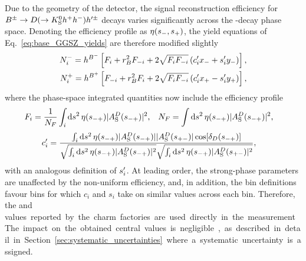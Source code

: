 Due to the geometry of the \lhcb detector, the signal reconstruction efficiency for ${{B}^\pm}\rightarrow{\ensuremath{D}}(\rightarrow{\ensuremath{{K}^0_{\mathrm{S}}}} h^+h^-)h'^\pm$ decays varies significantly across the \D-decay phase space. Denoting the efficiency profile as $\eta(s_-, s_+)$, the yield equations of Eq.~\eqref{eq:base_GGSZ_yields} are therefore modified slightly
\begin{align}
\begin{split}    \label{eq:lhcb_GGSZ_yields}
    N^-_i = h^{{{B}^-}} \left[F_i + r_{B}^2F_{-i} + 2\sqrt{F_iF_{-i}}\left(c_i'x_-+s_i'y_-\right)\right], \\
    N^+_i = h^{{{B}^+}} \left[F_{-i} + r_{B}^2F_i + 2\sqrt{F_iF_{-i}}\left(c_i'x_+-s_i'y_+\right)\right],
\end{split}
\end{align}
where the phase-space integrated quantities now include the efficiency profile
\begin{align}\label{eq:Fi_def}
    F_i &= \frac{1}{N_F}\int_i\text{d}s^2 \,\eta(s_{-+})|A_{\rm S}^{D}(s_{-+})|^2, &
    N_F &=\int\text{d}s^2 \,\eta(s_{-+})|A_{\rm S}^{D}(s_{-+})|^2,
\end{align}
\begin{align}\label{eq:ci_si_with_eff}
\begin{split}
    c_i' &= \frac
    {\int_i \text{d}s^2 \,\eta(s_{-+})|A_{\rm S}^{D}(s_{-+})||A_{\rm S}^{D}(s_{+-})|\cos[\delta_D(s_{-+})]}
    {\sqrt{\int_i \text{d}s^2 \,\eta(s_{-+})|A_{\rm S}^{D}(s_{-+})|^2}\sqrt{\int_i \text{d}s^2 \,\eta(s_{-+})|A_{\rm S}^{D}(s_{+-})|^2}},
\end{split}
\end{align}
with an analogous definition of $s_i'$. At leading order, the strong-phase parameters are unaffected by the non-uniform efficiency, and, in addition, the bin definitions favour bins for which $c_i$ and $s_i$ take on similar values across each bin.  Therefore, the  \ci and \si values reported by the charm factories are used directly in the measurement. The impact on the obtained central values is negligible, as described in detail in Section~\ref{sec:systematic_uncertainties} where a systematic uncertainty is assigned. 

